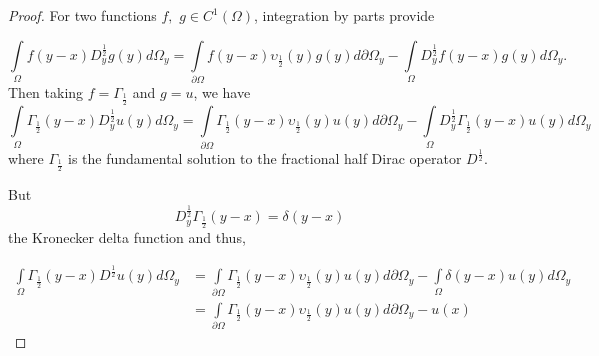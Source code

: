 \documentclass{amsart}%
\theoremstyle{plain}
\numberwithin{equation}{section}
\begin{document}
\begin{proof}
For two functions $f,$ $g\in C^{1}\left(  \Omega\right)  $, integration by
parts provide%

\[%
{\displaystyle\int\limits_{\Omega}}
f\left(  y-x\right)  D_{y}^{\frac{1}{2}}g(y)d\Omega_{y}=%
{\displaystyle\int\limits_{\partial\Omega}}
f\left(  y-x\right)  \upsilon_{\frac{1}{2}}\left(  y\right)  g\left(
y\right)  d\partial\Omega_{y}-%
{\displaystyle\int\limits_{\Omega}}
D_{y}^{\frac{1}{2}}f\left(  y-x\right)  g\left(  y\right)  d\Omega_{y}.
\]
Then taking $f=\Gamma_{\frac{1}{2}}$ and $g=u$, we have
\[%
{\displaystyle\int\limits_{\Omega}}
\Gamma_{\frac{1}{2}}\left(  y-x\right)  D_{y}^{\frac{1}{2}}u(y)d\Omega_{y}=%
{\displaystyle\int\limits_{\partial\Omega}}
\Gamma_{\frac{1}{2}}\left(  y-x\right)  \upsilon_{\frac{1}{2}}\left(
y\right)  u\left(  y\right)  d\partial\Omega_{y}-%
{\displaystyle\int\limits_{\Omega}}
D_{y}^{\frac{1}{2}}\Gamma_{\frac{1}{2}}\left(  y-x\right)  u\left(  y\right)
d\Omega_{y}%
\]
where $\Gamma_{\frac{1}{2}}$ is the fundamental solution to the fractional
half Dirac operator $D^{\frac{1}{2}}$.

But
\[
D_{y}^{\frac{1}{2}}\Gamma_{\frac{1}{2}}\left(  y-x\right)  =\delta\left(
y-x\right)
\]
the Kronecker delta function and thus, \ %

\begin{align*}%
{\displaystyle\int\limits_{\Omega}}
\Gamma_{\frac{1}{2}}\left(  y-x\right)  D^{\frac{1}{2}}u(y)d\Omega_{y}  & =%
{\displaystyle\int\limits_{\partial\Omega}}
\Gamma_{\frac{1}{2}}\left(  y-x\right)  \upsilon_{\frac{1}{2}}\left(
y\right)  u\left(  y\right)  d\partial\Omega_{y}-%
{\displaystyle\int\limits_{\Omega}}
\delta\left(  y-x\right)  u\left(  y\right)  d\Omega_{y}\\
& =%
{\displaystyle\int\limits_{\partial\Omega}}
\Gamma_{\frac{1}{2}}\left(  y-x\right)  \upsilon_{\frac{1}{2}}\left(
y\right)  u\left(  y\right)  d\partial\Omega_{y}-u(x)
\end{align*}



\end{proof}
\end{document}
